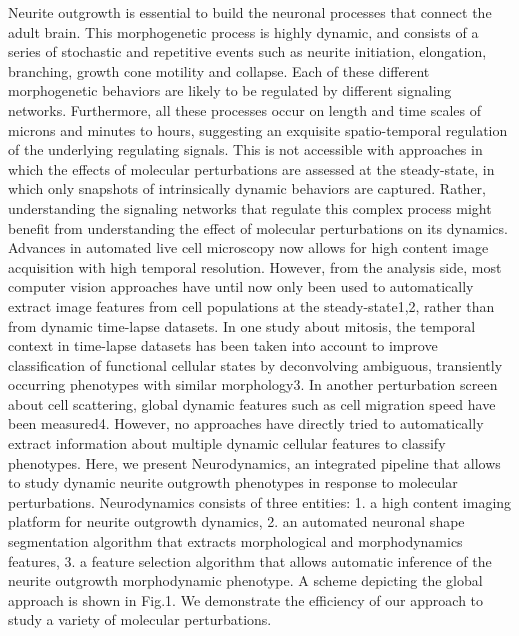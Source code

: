 Neurite outgrowth is essential to build the neuronal processes that connect the adult brain. This morphogenetic process is highly dynamic, and consists of a series of stochastic and repetitive events such as neurite initiation, elongation, branching, growth cone motility and collapse. Each of these different morphogenetic behaviors are likely to be regulated by different signaling networks. Furthermore, all these processes occur on length and time scales of microns and minutes to hours, suggesting an exquisite spatio-temporal regulation of the underlying regulating signals. This is not accessible with approaches in which the effects of molecular perturbations are assessed at the steady-state\cite{Snijder09,Collinet10}, in which only snapshots of intrinsically dynamic behaviors are captured. Rather, understanding the signaling networks that regulate this complex process might benefit from understanding the effect of molecular perturbations on its dynamics.
Advances in automated live cell microscopy now allows for high content image acquisition with high temporal resolution\cite{Held:2010dv}. However, from the analysis side, most computer vision approaches have until now only been used to automatically extract image features from cell populations at the steady-state1,2, rather than from dynamic time-lapse datasets. In one study about mitosis, the temporal context in time-lapse datasets has been taken into account to improve classification of functional cellular states by deconvolving ambiguous, transiently occurring phenotypes with similar morphology3. In another perturbation screen about cell scattering, global dynamic features such as cell migration speed have been measured4. However, no approaches have directly tried to automatically extract information about multiple dynamic cellular features to classify phenotypes.
Here, we present Neurodynamics, an integrated pipeline that allows to study dynamic neurite outgrowth phenotypes in response to molecular perturbations. Neurodynamics consists of three entities: 1. a high content imaging platform for neurite outgrowth dynamics, 2. an automated neuronal shape segmentation algorithm that extracts morphological and morphodynamics features, 3. a feature selection algorithm that allows automatic inference of the neurite outgrowth morphodynamic phenotype. A scheme depicting the global approach is shown in Fig.1. We demonstrate the efficiency of our approach to study a variety of molecular perturbations.
